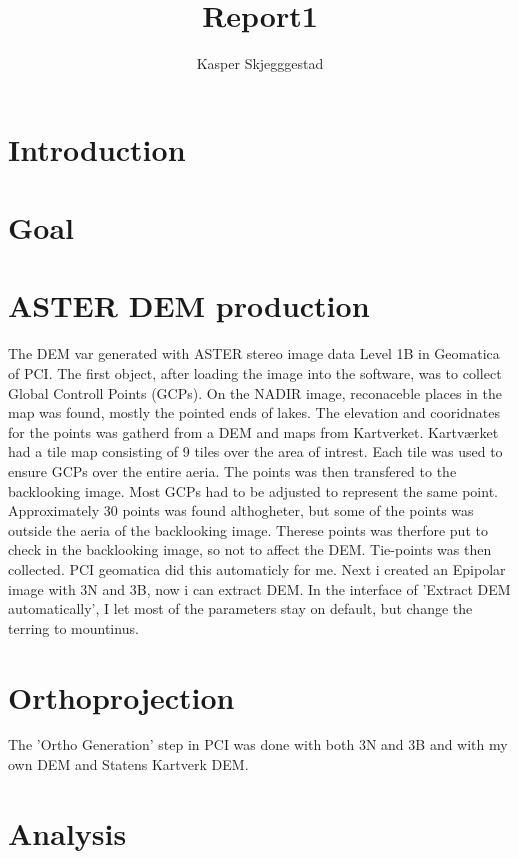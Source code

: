 \documentclass[a4paper,UKenglish]{article}
\title{Report1}
\author{Kasper Skjegggestad}
\begin{document}
\maketitle
\tableofcontents

\section{Introduction}

\section{Goal}

\section{ASTER DEM production}

The DEM var generated with ASTER stereo image data Level 1B in Geomatica of PCI. The first object, after loading the image into the software, was to collect Global Controll Points (GCPs). On the NADIR image, reconaceble places in the map was found, mostly the pointed ends of lakes. The elevation and cooridnates for the points was gatherd from a DEM and maps from Kartverket. Kartværket had a tile map consisting of 9 tiles over the area of intrest. Each tile was used to ensure GCPs over the entire aeria. The points was then transfered to the backlooking image. Most GCPs had to be adjusted to represent the same point. Approximately 30 points was found althogheter, but some of the points was outside the aeria of the backlooking image. Therese points was therfore put to check in the backlooking image, so not to affect the DEM. Tie-points was then collected. PCI geomatica did this automaticly for me.
Next i created an Epipolar image with 3N and 3B, now i can extract DEM. In the interface of 'Extract DEM automatically', I let most of the parameters stay on default, but change the terring to mountinus.

\section{Orthoprojection}

The 'Ortho Generation' step in PCI was done with both 3N and 3B and with my own DEM and Statens Kartverk DEM.

\section{Analysis}
\end{document}
